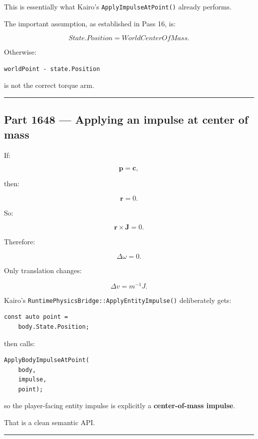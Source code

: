 This is essentially what Kairo's \texttt{ApplyImpulseAtPoint()} already performs.

The important assumption, as established in Pass 16, is:

\[
\boxed{
State.Position
=
WorldCenterOfMass.
}
\]

Otherwise:

\begin{verbatim}
worldPoint - state.Position
\end{verbatim}

is not the correct torque arm.

\begin{center}\rule{0.5\linewidth}{0.5pt}\end{center}

\subsection{Part 1648 --- Applying an impulse at center of mass}\label{06-engine-ii-ch036-part-1648-applying-an-impulse-at-center-of-mass}

If:

\[
\mathbf p=\mathbf c,
\]

then:

\[
\mathbf r=0.
\]

So:

\[
\mathbf r\times\mathbf J=0.
\]

Therefore:

\[
\Delta\omega=0.
\]

Only translation changes:

\[
\boxed{
\Delta v=m^{-1}J.
}
\]

Kairo's \texttt{RuntimePhysicsBridge::ApplyEntityImpulse()} deliberately gets:

\begin{verbatim}
const auto point =
    body.State.Position;
\end{verbatim}

then calls:

\begin{verbatim}
ApplyBodyImpulseAtPoint(
    body,
    impulse,
    point);
\end{verbatim}

so the player-facing entity impulse is explicitly a \textbf{center-of-mass impulse}.

That is a clean semantic API.

\begin{center}\rule{0.5\linewidth}{0.5pt}\end{center}

